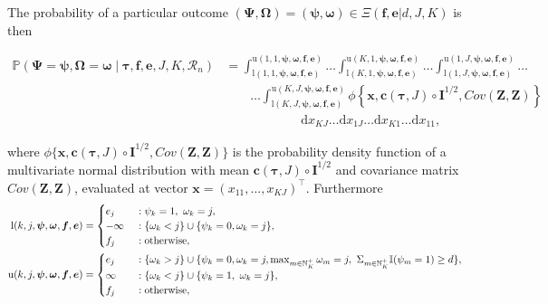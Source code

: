 \documentclass{article}
\numberwithin{equation}{section}
\theoremstyle{plain}
\begin{document}
The probability of a particular outcome $(\boldsymbol{\Psi},\boldsymbol{\Omega})=(\boldsymbol{\psi},\boldsymbol{\omega})\in\Xi(\boldsymbol{f},\boldsymbol{e}|d,J,K)$ is then
\begin{normalsize}
	\begin{align*}
	\mathbb{P}(\boldsymbol{\Psi}=\boldsymbol{\psi},\boldsymbol{\Omega}=\boldsymbol{\omega}\mid\boldsymbol{\tau},\boldsymbol{f},\boldsymbol{e},J,K,\mathscr{R}_n) &= \int_{\text{l}(1,1,\boldsymbol{\psi},\boldsymbol{\omega},\boldsymbol{f},\boldsymbol{e})}^{\text{u}(1,1,\boldsymbol{\psi},\boldsymbol{\omega},\boldsymbol{f},\boldsymbol{e})} \dots \int_{\text{l}(K,1,\boldsymbol{\psi},\boldsymbol{\omega},\boldsymbol{f},\boldsymbol{e})}^{\text{u}(K,1,\boldsymbol{\psi},\boldsymbol{\omega},\boldsymbol{f},\boldsymbol{e})} \dots \int_{\text{l}(1,J,\boldsymbol{\psi},\boldsymbol{\omega},\boldsymbol{f},\boldsymbol{e})}^{\text{u}(1,J,\boldsymbol{\psi},\boldsymbol{\omega},\boldsymbol{f},\boldsymbol{e})} \dots  \\ & \qquad \dots \int_{\text{l}(K,J,\boldsymbol{\psi},\boldsymbol{\omega},\boldsymbol{f},\boldsymbol{e})}^{\text{u}(K,J,\boldsymbol{\psi},\boldsymbol{\omega},\boldsymbol{f},\boldsymbol{e})} \! \phi\left\{\boldsymbol{x},\boldsymbol{c}(\boldsymbol{\tau},J) \circ \boldsymbol{I}^{1/2}, Cov(\boldsymbol{Z},\boldsymbol{Z})\right\} \ \\
	& \qquad \qquad \qquad \mathrm{d}x_{KJ}\dots \mathrm{d}x_{1J}\dots\mathrm{d}x_{K1}\dots\mathrm{d}x_{11},\label{probsni}
	\end{align*}
\end{normalsize}
where $\phi\{\boldsymbol{x},\boldsymbol{c}(\boldsymbol{\tau},J) \circ \boldsymbol{I}^{1/2}, Cov(\boldsymbol{Z},\boldsymbol{Z})\}$ is the probability density function of a multivariate normal distribution with mean $\boldsymbol{c}(\boldsymbol{\tau},J) \circ \boldsymbol{I}^{1/2}$ and covariance matrix $Cov(\boldsymbol{Z},\boldsymbol{Z})$, evaluated at vector $\boldsymbol{x}=(x_{11},\dots,x_{KJ})^\top$. Furthermore
\begin{align*}
\text{l}(k,j,\boldsymbol{\psi},\boldsymbol{\omega},\boldsymbol{f},\boldsymbol{e}) &= \begin{cases} e_j &: \psi_k=1,\ \omega_k=j, \\ -\infty &: \{\omega_k<j\}\cup\{\psi_k=0, \omega_k=j\}, \\ f_j \hphantom{a+}  &: \text{otherwise}, \end{cases}\\
\text{u}(k,j,\boldsymbol{\psi},\boldsymbol{\omega},\boldsymbol{f},\boldsymbol{e}) &= \begin{cases} e_j &: \{\omega_k>j\}\cup\{\psi_k=0, \omega_k=j,\max_{m\in\mathbb{N}_K^+}\omega_m=j,\ \Sigma_{m\in\mathbb{N}_K^+}\mathbb{I}(\psi_m=1)\ge d\}, \\ \infty &: \{\omega_k<j\}\cup\{\psi_k=1,\ \omega_k=j\}, \\ f_j \hphantom{a+} &: \text{otherwise}, \end{cases}
\end{align*}
\end{document}
